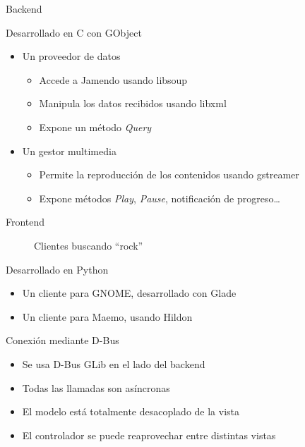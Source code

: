 \documentclass{beamer}
\begin{document}
\begin{frame}{Backend}
\begin{block}{Desarrollado en C con GObject}
\begin{itemize}
  \item Un proveedor de datos
  \begin{itemize}
    \item Accede a Jamendo usando libsoup
    \item Manipula los datos recibidos usando libxml
    \item Expone un método {\it Query}
  \end{itemize}
  \item Un gestor multimedia
  \begin{itemize}
    \item Permite la reproducción de los contenidos usando gstreamer
    \item Expone métodos {\it Play}, {\it Pause}, notificación de progreso\ldots
  \end{itemize}
\end{itemize}
\end{block}
\end{frame}

\begin{frame}{Frontend}
\begin{center}
\begin{figure}
\hskip0.1cm
\caption{Clientes buscando ``rock''}
\end{figure}
\end{center}
\begin{block}{Desarrollado en Python}
\begin{itemize}
  \item Un cliente para GNOME, desarrollado con Glade
  \item Un cliente para Maemo, usando Hildon
\end{itemize}
\end{block}
\end{frame}

\begin{frame}{Conexión mediante D-Bus}
\begin{itemize}
  \item Se usa D-Bus GLib en el lado del backend
  \item Todas las llamadas son asíncronas
  \item El modelo está totalmente desacoplado de la vista
  \item El controlador se puede reaprovechar entre distintas vistas
\end{itemize}
\end{frame}
\end{document}
